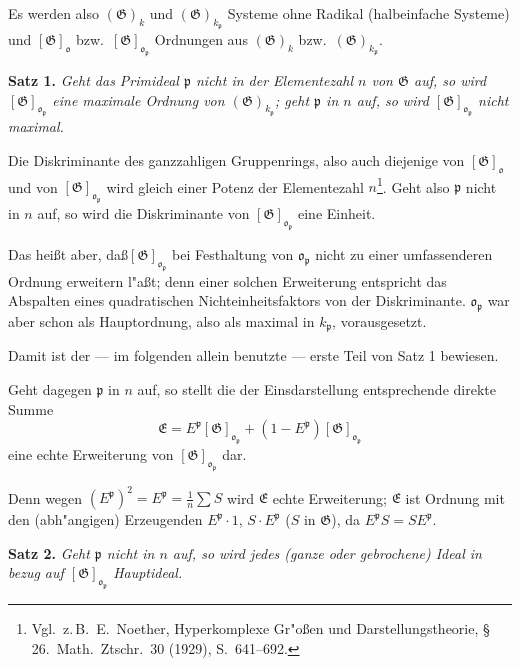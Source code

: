 \documentclass[12pt,a4paper]{article}
\theoremstyle{plain}
\begin{document}
Es werden also $(\mathfrak{G})_k$ und $(\mathfrak{G})_{k_\mathfrak{p}}$ Systeme ohne Radikal (halbeinfache Systeme) und $[\mathfrak{G}]_\mathfrak{o}$ bzw.\ $[\mathfrak{G}]_{\mathfrak{o}_\mathfrak{p}}$ Ordnungen aus $(\mathfrak{G})_k$ bzw.\ $(\mathfrak{G})_{k_\mathfrak{p}}$.

\medskip\noindent\textbf{Satz 1.}
\textit{Geht das Primideal $\mathfrak{p}$ nicht in der Elementezahl $n$ von $\mathfrak{G}$ auf, so wird $[\mathfrak{G}]_{\mathfrak{o}_\mathfrak{p}}$ eine maximale Ordnung von $(\mathfrak{G})_{k_\mathfrak{p}}$; geht $\mathfrak{p}$ in $n$ auf, so wird $[\mathfrak{G}]_{\mathfrak{o}_\mathfrak{p}}$ nicht maximal.}

Die Diskriminante des ganzzahligen Gruppenrings, also auch diejenige von $[\mathfrak{G}]_\mathfrak{o}$ und von $[\mathfrak{G}]_{\mathfrak{o}_\mathfrak{p}}$ wird gleich einer Potenz der Elementezahl $n$\footnote{Vgl.\ z.\,B.\ E.\ Noether, Hyperkomplexe Gr"o\ss en und Darstellungstheorie, \S\,26.\ Math.\ Ztschr.\ 30 (1929), S.\ 641--692.}. Geht also $\mathfrak{p}$ nicht in $n$ auf, so wird die Diskriminante von $[\mathfrak{G}]_{\mathfrak{o}_\mathfrak{p}}$ eine Einheit.

Das hei\ss t aber, da\ss $[\mathfrak{G}]_{\mathfrak{o}_\mathfrak{p}}$ bei Festhaltung von $\mathfrak{o}_\mathfrak{p}$ nicht zu einer umfassenderen Ordnung erweitern l"a\ss t; denn einer solchen Erweiterung entspricht das Abspalten eines quadratischen Nichteinheitsfaktors von der Diskriminante. $\mathfrak{o}_\mathfrak{p}$ war aber schon als Hauptordnung, also als maximal in $k_\mathfrak{p}$, vorausgesetzt.

Damit ist der --- im folgenden allein benutzte --- erste Teil von Satz 1 bewiesen.

Geht dagegen $\mathfrak{p}$ in $n$ auf, so stellt die der Einsdarstellung entsprechende direkte Summe
\[
\mathfrak{E} = E^\mathfrak{p} [\mathfrak{G}]_{\mathfrak{o}_\mathfrak{p}} + (1 - E^\mathfrak{p}) [\mathfrak{G}]_{\mathfrak{o}_\mathfrak{p}}
\]
eine echte Erweiterung von $[\mathfrak{G}]_{\mathfrak{o}_\mathfrak{p}}$ dar.

Denn wegen $(E^\mathfrak{p})^2 = E^\mathfrak{p} = \frac{1}{n}\sum S$ wird $\mathfrak{E}$ echte Erweiterung; $\mathfrak{E}$ ist Ordnung mit den (abh"angigen) Erzeugenden $E^\mathfrak{p} \cdot 1$, $S \cdot E^\mathfrak{p}$ ($S$ in $\mathfrak{G}$), da $E^\mathfrak{p} S = S E^\mathfrak{p}$.

\medskip\noindent\textbf{Satz 2.}
\textit{Geht $\mathfrak{p}$ nicht in $n$ auf, so wird jedes (ganze oder gebrochene) Ideal in bezug auf $[\mathfrak{G}]_{\mathfrak{o}_\mathfrak{p}}$ Hauptideal.}
\end{document}
